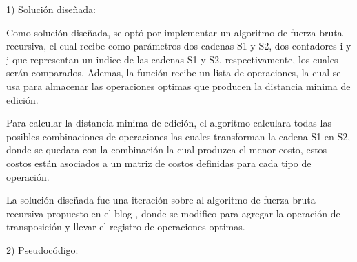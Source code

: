 1)  Solución diseñada:

Como solución diseñada, se optó por implementar un algoritmo de fuerza
bruta recursiva, el cual recibe como parámetros dos cadenas S1 y S2, dos 
contadores i y j que representan un indice de las cadenas S1 y S2, respectivamente, los cuales serán comparados.
Ademas, la función recibe un lista de operaciones, la cual se usa para almacenar
las operaciones optimas que producen la distancia minima de edición.

Para calcular la distancia minima de edición, el algoritmo calculara todas las posibles
combinaciones de operaciones las cuales transforman la cadena S1 en S2, donde se quedara
con la combinación la cual produzca el menor costo, estos costos están asociados
a un matriz de costos definidas para cada tipo de operación.

La solución diseñada fue una iteración sobre al algoritmo de fuerza bruta
recursiva propuesto en el 
blog \citeauthor{EditDistance} \cite{EditDistance}
, donde se modifico para agregar la operación de transposición y llevar el registro
de operaciones optimas.


2) Pseudocódigo:

\begin{comment}
\epigraph{\textit{``Indeed, brute force is a perfectly good technique in many cases; the real question is, can we use brute force in such a way that we avoid the worst-case behavior?''}}{--- \citeauthor{taocv3}, \citeyear{taocv3} \cite{taocv3}}
\end{comment}

